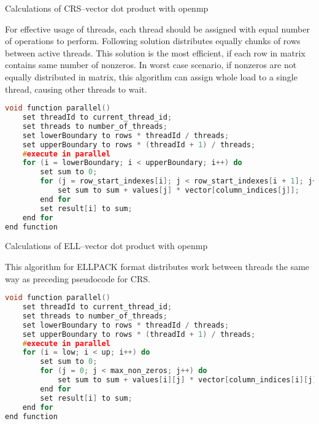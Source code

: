 	\begin{concerns}{Calculations of \gls{CRS}--vector dot product with \gls{openmp}}{}
		
		For effective usage of threads, each thread should be assigned with equal number of operations to perform. Following solution distributes equally chunks of rows between active threads. This solution is the most efficient, if each row in matrix contains same number of nonzeros. In worst case scenario, if nonzeros are not equally distributed in matrix, this algorithm can assign whole load to a single thread, causing other threads to wait. 
		\begin{lstlisting}[language=C++, caption={Pseudocode of \gls{CRS}--vector dot product with \gls{openmp}.}]
void function parallel()
	set threadId to current_thread_id;
	set threads to number_of_threads;
	set lowerBoundary to rows * threadId / threads;
	set upperBoundary to rows * (threadId + 1) / threads;
	#execute in parallel
	for (i = lowerBoundary; i < upperBoundary; i++) do
		set sum to 0;
		for (j = row_start_indexes[i]; j < row_start_indexes[i + 1]; j++) do
			set sum to sum + values[j] * vector[column_indices[j]];
		end for
		set result[i] to sum;
	end for
end function
		\end{lstlisting}
	\end{concerns}
	\clearpage
	\begin{concerns}{Calculations of \gls{ELL}--vector dot product with \gls{openmp}}{}
		
		This algorithm for ELLPACK format distributes work between threads the same way as preceding pseudocode for CRS.
		\begin{lstlisting}[language=C++, caption={Pseudocode of \gls{ELL}--vector dot product with \gls{openmp}.}]
void function parallel() 
	set threadId to current_thread_id;
	set threads to number_of_threads;
	set lowerBoundary to rows * threadId / threads;
	set upperBoundary to rows * (threadId + 1) / threads;
	#execute in parallel
	for (i = low; i < up; i++) do
		set sum to 0;
		for (j = 0; j < max_non_zeros; j++) do
			set sum to sum + values[i][j] * vector[column_indices[i][j]];
		end for
		set result[i] to sum;
	end for
end function
		\end{lstlisting}
	\end{concerns}	

	\pagebreak

